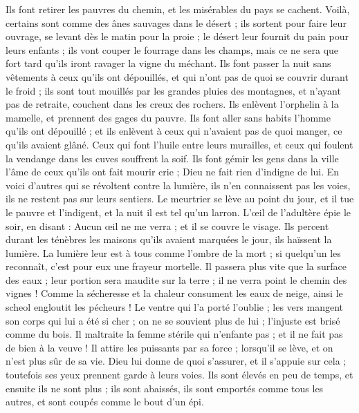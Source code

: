 \begin{multicols}{2}
Ils font retirer les pauvres du chemin, et les misérables du pays se cachent.
Voilà, certains sont comme des ânes sauvages dans le désert ; ils sortent pour faire leur ouvrage, se levant dès le matin pour la proie ; le désert leur fournit du pain pour leurs enfants ;
ils vont couper le fourrage dans les champs, mais ce ne sera que fort tard qu'ils iront ravager la vigne du méchant. 
Ils font passer la nuit sans vêtements à ceux qu'ils ont dépouillés, et qui n'ont pas de quoi se couvrir durant le froid  ;
ils sont tout mouillés par les grandes pluies des montagnes, et n'ayant pas de retraite, couchent dans les creux des rochers. 
Ils enlèvent l'orphelin à la mamelle, et prennent des gages du pauvre. 
Ils font aller sans habits l'homme qu'ils ont dépouillé ; et ils enlèvent à ceux qui n'avaient pas de quoi manger, ce qu'ils avaient glâné.
Ceux qui font l'huile entre leurs murailles, et ceux qui foulent la vendange dans les cuves souffrent la soif.
Ils font gémir les gens dans la ville l'âme de ceux qu'ils ont fait mourir crie ; Dieu ne fait rien d'indigne de lui.
En voici d'autres qui se révoltent contre la lumière, ils n'en connaissent pas les voies, ils ne restent pas sur leurs sentiers.
Le meurtrier se lève au point du jour, et il tue le pauvre et l'indigent, et la nuit il est tel qu'un larron.
L'œil de l'adultère épie le soir, en disant : Aucun œil ne me verra ; et il se couvre le visage.
Ils percent durant les ténèbres les maisons qu'ils avaient marquées le jour, ils haïssent la lumière.
La lumière leur est à tous comme l'ombre de la mort ; si quelqu'un les reconnaît, c'est pour eux une frayeur mortelle.
Il passera plus vite que la surface des eaux ; leur portion sera maudite sur la terre ; il ne verra point le chemin des vignes !
Comme la sécheresse et la chaleur consument les eaux de neige, ainsi le scheol engloutit les pécheurs !
Le ventre qui l'a porté l'oublie ; les vers mangent son corps qui lui a été si cher ; on ne se souvient plus de lui ; l'injuste est brisé comme du bois.
Il maltraite la femme stérile qui n'enfante pas ; et il ne fait pas de bien à la veuve !
Il attire les puissants par sa force ; lorsqu'il se lève, et on n'est plus sûr de sa vie. 
Dieu lui donne de quoi s'assurer, et il s'appuie sur cela ; toutefois ses yeux prennent garde à leurs voies.
Ils sont élevés en peu de temps, et ensuite ils ne sont plus ; ils sont abaissés, ils sont emportés comme tous les autres, et sont coupés comme le bout d'un épi. 

\end{multicols}

